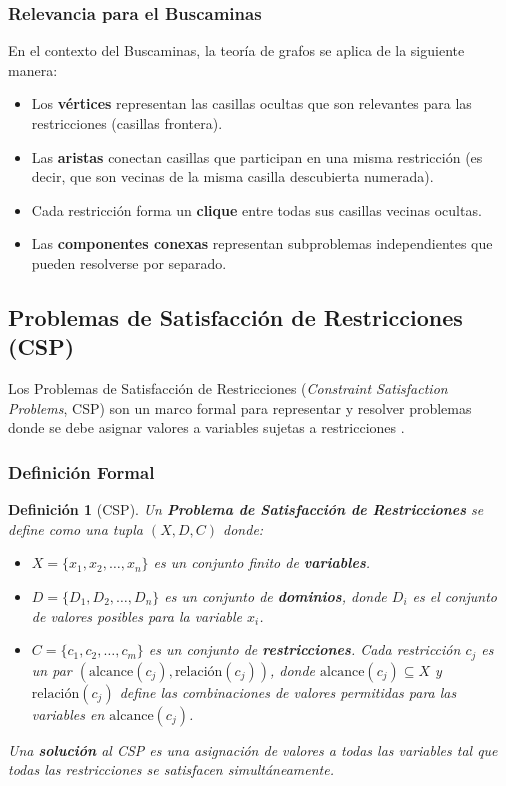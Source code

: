 \documentclass[12pt,a4paper]{article}
\newtheorem{definition}{Definición}[section]
\begin{document}
\subsubsection{Relevancia para el Buscaminas}

En el contexto del Buscaminas, la teoría de grafos se aplica de la siguiente manera:

\begin{itemize}[itemsep=2pt]
    \item Los \textbf{vértices} representan las casillas ocultas que son relevantes para las restricciones (casillas frontera).
    \item Las \textbf{aristas} conectan casillas que participan en una misma restricción (es decir, que son vecinas de la misma casilla descubierta numerada).
    \item Cada restricción forma un \textbf{clique} entre todas sus casillas vecinas ocultas.
    \item Las \textbf{componentes conexas} representan subproblemas independientes que pueden resolverse por separado.
\end{itemize}

\subsection{Problemas de Satisfacción de Restricciones (CSP)}

Los Problemas de Satisfacción de Restricciones (\textit{Constraint Satisfaction Problems}, CSP) son un marco formal para representar y resolver problemas donde se debe asignar valores a variables sujetas a restricciones \cite{russell2010ai, dechter2003constraint}.

\subsubsection{Definición Formal}

\begin{definition}[CSP]
Un \textbf{Problema de Satisfacción de Restricciones} se define como una tupla $(X, D, C)$ donde:
\begin{itemize}[itemsep=2pt]
    \item $X = \{x_1, x_2, \ldots, x_n\}$ es un conjunto finito de \textbf{variables}.
    \item $D = \{D_1, D_2, \ldots, D_n\}$ es un conjunto de \textbf{dominios}, donde $D_i$ es el conjunto de valores posibles para la variable $x_i$.
    \item $C = \{c_1, c_2, \ldots, c_m\}$ es un conjunto de \textbf{restricciones}. Cada restricción $c_j$ es un par $(\text{alcance}(c_j), \text{relación}(c_j))$, donde $\text{alcance}(c_j) \subseteq X$ y $\text{relación}(c_j)$ define las combinaciones de valores permitidas para las variables en $\text{alcance}(c_j)$.
\end{itemize}
Una \textbf{solución} al CSP es una asignación de valores a todas las variables tal que todas las restricciones se satisfacen simultáneamente.
\end{definition}
\end{document}
